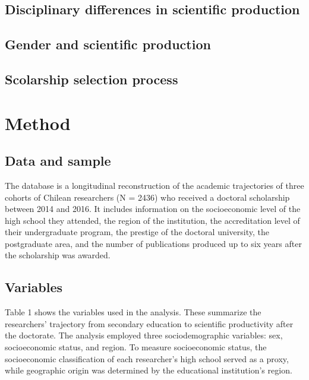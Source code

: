 \documentclass[
  spanish,
  12pt,
  letterpaper,
]{article}
\begin{document}
\subsection{Disciplinary differences in scientific
production}\label{disciplinary-differences-in-scientific-production}

\subsection{Gender and scientific
production}\label{gender-and-scientific-production}

\subsection{Scolarship selection
process}\label{scolarship-selection-process}

\section{Method}\label{method}

\subsection{Data and sample}\label{data-and-sample}

The database is a longitudinal reconstruction of the academic
trajectories of three cohorts of Chilean researchers (N = 2436) who
received a doctoral scholarship between 2014 and 2016. It includes
information on the socioeconomic level of the high school they attended,
the region of the institution, the accreditation level of their
undergraduate program, the prestige of the doctoral university, the
postgraduate area, and the number of publications produced up to six
years after the scholarship was awarded.

\subsection{Variables}\label{variables}

Table 1 shows the variables used in the analysis. These summarize the
researchers' trajectory from secondary education to scientific
productivity after the doctorate. The analysis employed three
sociodemographic variables: sex, socioeconomic status, and region. To
measure socioeconomic status, the socioeconomic classification of each
researcher's high school served as a proxy, while geographic origin was
determined by the educational institution's region.
\end{document}
